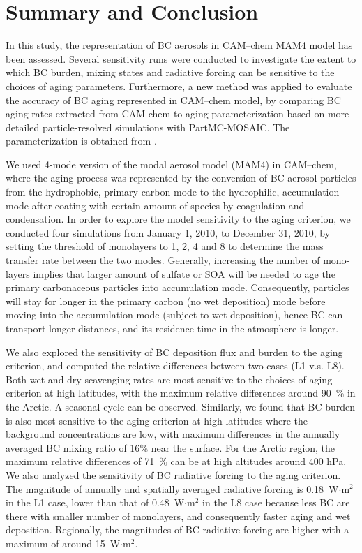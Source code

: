 \documentclass[12pt, fullpage]{uiucthesis2009}
\begin{document}
	
	\chapter{Summary and Conclusion}
		In this study, the representation of BC aerosols in CAM--chem MAM4 model has been assessed. Several sensitivity runs were conducted to investigate the extent to which BC burden, mixing states and radiative forcing can be sensitive to the choices of aging parameters. Furthermore, a new method was applied to evaluate the accuracy of BC aging represented in CAM--chem model, by comparing BC aging rates extracted from CAM-chem to aging parameterization based on more detailed particle-resolved simulations with PartMC-MOSAIC. The parameterization is obtained from \citet{Fierce2016}. 
		
		We used 4-mode version of the modal aerosol model (MAM4) in CAM--chem, where the aging process was represented by the conversion of BC aerosol particles from the hydrophobic, primary carbon mode to the hydrophilic, accumulation mode after coating with certain amount of species by coagulation and condensation. In order to explore the model sensitivity to the aging criterion, we conducted four simulations from January 1, 2010, to December 31, 2010, by setting the threshold of monolayers to 1, 2, 4 and 8 to determine the mass transfer rate between the two modes. Generally, increasing the number of mono-layers implies that larger amount of sulfate or SOA will be needed to age the primary carbonaceous particles into accumulation mode. Consequently, particles will stay for longer in the primary carbon (no wet deposition) mode before moving into the accumulation mode (subject to wet deposition), hence BC can transport longer distances, and its residence time in the atmosphere is longer. 
		
		We also explored the sensitivity of BC deposition flux and burden to the aging criterion, and computed the relative differences between two cases (L1 v.s. L8). Both wet and dry scavenging rates are most sensitive to the choices of aging criterion at high latitudes, with the maximum relative differences around 90~$\%$ in the Arctic. A seasonal cycle can be observed. Similarly, we found that BC burden is also most sensitive to the aging criterion at high latitudes where the background concentrations are low, with maximum differences in the annually averaged BC mixing ratio of 16$\%$ near the surface. For the Arctic region, the maximum relative differences of 71~$\%$ can be at high altitudes around 400 hPa. We also analyzed the sensitivity of BC radiative forcing to the aging criterion. The magnitude of annually and spatially averaged radiative forcing is 0.18~W$\cdot{\text{m}^2}$ in the L1 case, lower than that of 0.48~W$\cdot{\text{m}^2}$ in the L8 case because less BC are there with smaller number of monolayers, and consequently faster aging and wet deposition. Regionally, the magnitudes of BC radiative forcing are higher with a maximum of around 15~W$\cdot{\text{m}^2}$.  
		
\end{document}
